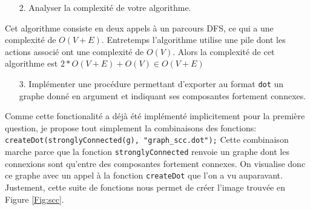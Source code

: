 \documentclass[10pt]{article} %
\begin{document}
\begin{itemize}
    \item [2.] Analyser la complexité de votre algorithme.
\end{itemize}

Cet algorithme consiste en deux appels à un parcours DFS, ce qui a une complexité de $O(V + E)$. Entretemps l'algorithme utilise une pile dont les actions associé ont une complexité de
$O(V)$. Alors la complexité de cet algorithme est $2*O(V+E) + O(V) \in O(V + E)$

\begin{itemize}
    \item [3.] Implémenter une procédure permettant d'exporter au format \texttt{dot} un graphe donné en argument et indiquant ses composantes fortement connexes.
\end{itemize}

Comme cette fonctionalité a déjà été implémenté implicitement pour la première question, je propose tout simplement la combinaisons des fonctions:
\texttt{createDot(stronglyConnected(g), "graph\_scc.dot");} Cette combinaison marche parce que la fonction \texttt{stronglyConnected} renvoie un graphe dont les connexions sont
qu'entre des composantes fortement connexes. On visualise donc ce graphe avec un appel à la fonction \texttt{createDot} que l'on a vu auparavant. Justement, cette suite de fonctions nous permet
de créer l'image trouvée en Figure \ref{Fig:scc}.
\end{document}
